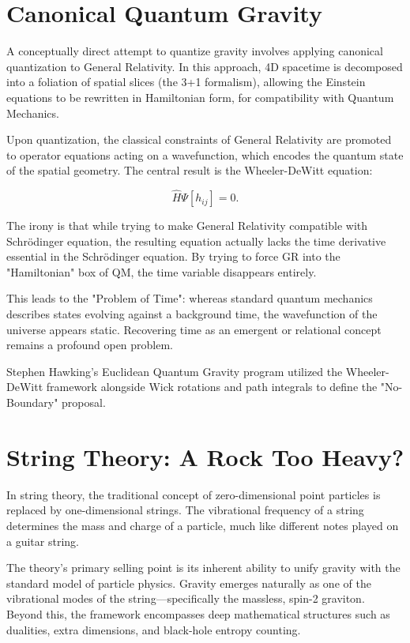 \section{Canonical Quantum Gravity}

A conceptually direct attempt to quantize gravity involves applying canonical quantization to General Relativity. In this approach, 4D spacetime is decomposed into a foliation of spatial slices (the 3+1 formalism), allowing the Einstein equations to be rewritten in Hamiltonian form, for compatibility with Quantum Mechanics.

Upon quantization, the classical constraints of General Relativity are promoted to operator equations acting on a wavefunction, which encodes the quantum state of the spatial geometry.
The central result is the Wheeler-DeWitt equation:

\[
\hat{H}\Psi[h_{ij}] = 0.
\]

The irony is that while trying to make General Relativity compatible with Schrödinger equation, the resulting equation actually lacks the time derivative essential in the Schrödinger equation. By trying to force GR into the "Hamiltonian" box of QM, the time variable disappears entirely. 

This leads to the "Problem of Time": whereas standard quantum mechanics describes states evolving against a background time, the wavefunction of the universe appears static. Recovering time as an emergent or relational concept remains a profound open problem.

Stephen Hawking’s Euclidean Quantum Gravity program utilized the Wheeler-DeWitt framework alongside Wick rotations and path integrals to define the "No-Boundary" proposal.


\section{String Theory: A Rock Too Heavy?}

In string theory, the traditional concept of zero-dimensional point particles is replaced by one-dimensional strings.
The vibrational frequency of a string determines the mass and charge of a particle, much like different notes played on a guitar string.

The theory's primary selling point is its inherent ability to unify gravity with the standard model of particle physics.
Gravity emerges naturally as one of the vibrational modes of the string—specifically the massless, spin-2 graviton.
Beyond this, the framework encompasses deep mathematical structures such as dualities, extra dimensions, and black-hole entropy counting.

